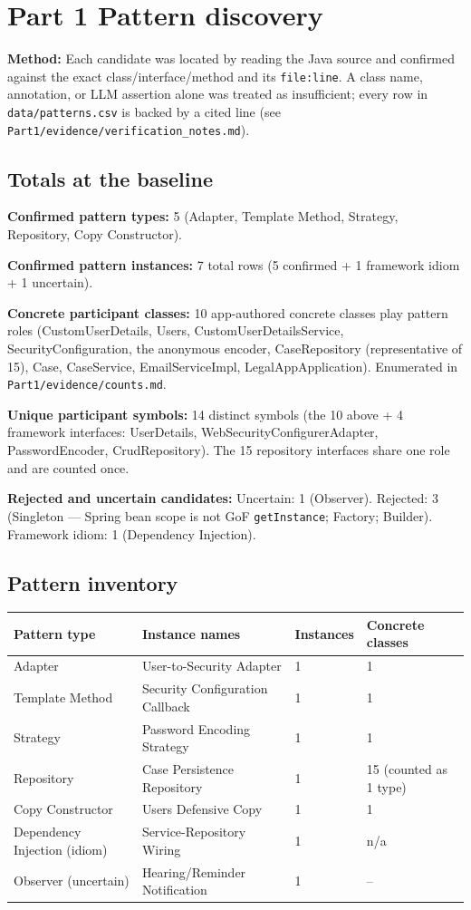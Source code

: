 \documentclass[11pt,a4paper]{article}
\begin{document}
\section{Part 1 Pattern discovery}
\textbf{Method:} Each candidate was located by reading the Java source and confirmed against the exact class/interface/method and its \texttt{file:line}. A class name, annotation, or LLM assertion alone was treated as insufficient; every row in \texttt{data/patterns.csv} is backed by a cited line (see \texttt{Part1/evidence/verification\_notes.md}).

\subsection{Totals at the baseline}
\textbf{Confirmed pattern types:} 5 (Adapter, Template Method, Strategy, Repository, Copy Constructor).\par
\textbf{Confirmed pattern instances:} 7 total rows (5 confirmed + 1 framework idiom + 1 uncertain).\par
\textbf{Concrete participant classes:} 10 app-authored concrete classes play pattern roles (CustomUserDetails, Users, CustomUserDetailsService, SecurityConfiguration, the anonymous encoder, CaseRepository (representative of 15), Case, CaseService, EmailServiceImpl, LegalAppApplication). Enumerated in \texttt{Part1/evidence/counts.md}.\par
\textbf{Unique participant symbols:} 14 distinct symbols (the 10 above + 4 framework interfaces: UserDetails, WebSecurityConfigurerAdapter, PasswordEncoder, CrudRepository). The 15 repository interfaces share one role and are counted once.\par
\textbf{Rejected and uncertain candidates:} Uncertain: 1 (Observer). Rejected: 3 (Singleton --- Spring bean scope is not GoF \texttt{getInstance}; Factory; Builder). Framework idiom: 1 (Dependency Injection).\par

\subsection{Pattern inventory}
\begin{tabularx}{\linewidth}{@{}lXll@{}}\toprule
Pattern type & Instance names & Instances & Concrete classes\\\midrule
Adapter & User-to-Security Adapter & 1 & 1\\
Template Method & Security Configuration Callback & 1 & 1\\
Strategy & Password Encoding Strategy & 1 & 1\\
Repository & Case Persistence Repository & 1 & 15 (counted as 1 type)\\
Copy Constructor & Users Defensive Copy & 1 & 1\\
Dependency Injection (idiom) & Service-Repository Wiring & 1 & n/a\\
Observer (uncertain) & Hearing/Reminder Notification & 1 & --\\\bottomrule
\end{tabularx}
\end{document}
